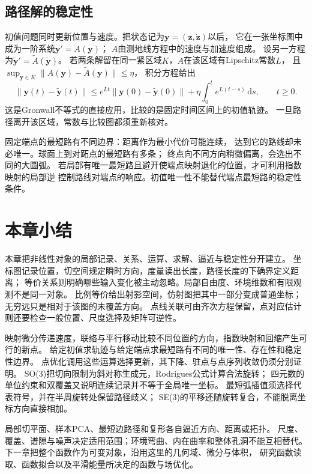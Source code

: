\subsection{路径解的稳定性}
\label{sec:geometry-path-solution-stability}

初值问题同时更新位置与速度。把状态记为$\bm y=(\bm z,\dot{\bm z})$以后，
它在一张坐标图中成为一阶系统$\bm y'=A(\bm y)$；
$A$由测地线方程中的速度与加速度组成。
设另一方程为$\widetilde{\bm y}'=\widetilde A(\widetilde{\bm y})$。
若两条解留在同一紧区域$K$，$A$在该区域有Lipschitz常数$L$，
且$\sup_{\bm y\in K}\lVert A(\bm y)-\widetilde A(\bm y)\rVert\leq\eta$，
积分方程给出
\[
 \lVert \bm y(t)-\widetilde{\bm y}(t)\rVert
 \leq e^{Lt}\lVert \bm y(0)-\widetilde{\bm y}(0)\rVert
       +\eta\int_0^t e^{L(t-s)}\,\mathrm ds,\qquad t\geq0.
\]
这是Gronwall不等式的直接应用，比较的是固定时间区间上的初值轨迹。
一旦路径离开该区域，常数与比较图都须重新核对。

固定端点的最短路有不同边界：距离作为最小代价可能连续，
达到它的路线却未必唯一。球面上到对跖点的最短路有多条；
终点向不同方向稍微偏离，会选出不同的大圆弧。
若局部有唯一最短路且避开使端点映射退化的位置，才可利用指数映射的局部逆
控制路线对端点的响应。初值唯一性不能替代端点最短路的稳定性条件。

\section{本章小结}
\label{sec:geometry-summary}

本章把非线性对象的局部记录、关系、运算、求解、逼近与稳定性分开建立。
坐标图记录位置，切空间规定瞬时方向，度量读出长度，路径长度的下确界定义距离；
等价关系则明确哪些输入变化被主动忽略。局部自由度、环境维数和有限观测不是同一对象。
比例等价给出射影空间，仿射图把其中一部分变成普通坐标；无穷远只是相对于该图的未覆盖方向。
点线关联可由齐次方程保留，点对应估计则还要检查一般位置、尺度选择及矩阵可逆性。

映射微分传递速度，联络与平行移动比较不同位置的方向，指数映射和回缩产生可行的新点。
给定初值求轨迹与给定端点求最短路有不同的唯一性、存在性和稳定性边界。
点优化调用这些运算选择更新，其下降、驻点与点序列收敛仍须分别证明。
SO(3)把切向限制为斜对称生成元，Rodrigues公式计算合法旋转；
四元数的单位约束和双覆盖又说明连续记录并不等于全局唯一坐标。
最短弧插值须选择代表符号，并在半周旋转处保留路径歧义；
SE(3)的平移还随旋转复合，不能脱离坐标方向直接相加。

局部切平面、样本PCA、最短边路径和复形各自逼近方向、距离或拓扑。
尺度、覆盖、谱隙与噪声决定适用范围；环境弯曲、内在曲率和整体孔洞不能互相替代。
下一章把整个函数作为可变对象，沿用这里的几何域、微分与体积，
研究函数读取、函数拟合以及平滑能量所决定的函数与场优化。
